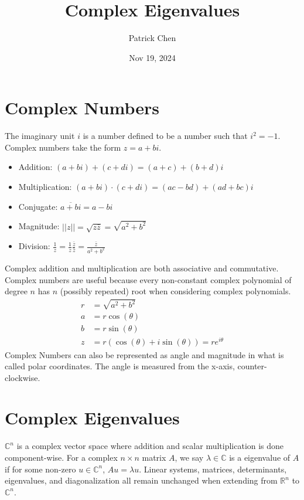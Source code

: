 \documentclass{article}
\title{Complex Eigenvalues}
\author{Patrick Chen}
\date{Nov 19, 2024}
\theoremstyle{mytheoremstyle}
\theoremstyle{mytheoremstyle}
\theoremstyle{myproblemstyle}
\begin{document}
    \maketitle
    \section*{Complex Numbers}
    The imaginary unit $i$ is a number defined to be a number such that
    $i^2=-1$. Complex numbers take the form $z=a+bi$.
    \begin{itemize}
        \item Addition: $(a+bi) + (c+di) = (a+c) + (b+d)i$
        \item Multiplication: $(a+bi) \cdot (c+di) = (ac-bd) + (ad+bc)i$
        \item Conjugate: $\overline{a+bi} = a-bi$
        \item Magnitude: $||z|| = \sqrt{z\bar{z}} = \sqrt{a^2+b^2}$
        \item Division: $\frac{1}{z} = \frac{1}{z} \frac{\bar{z}}{\bar{z}} = \frac{\bar{z}}{a^2+b^2}$
    \end{itemize}

    Complex addition and multiplication are both associative and commutative.
    Complex numbers are useful because every non-constant complex polynomial of
    degree $n$ has $n$ (possibly repeated) root when considering complex
    polynomials.
    \begin{align*}
        r &= \sqrt{a^2+b^2} \\
        a &= r\cos(\theta) \\
        b &= r\sin(\theta) \\
        z &= r(\cos(\theta) + i\sin(\theta)) = re^{i\theta}
    \end{align*}
    Complex Numbers can also be represented as angle and magnitude in what is
    called polar coordinates. The angle is measured from the x-axis,
    counter-clockwise.

    \section*{Complex Eigenvalues}
    $\mathbb{C}^n$ is a complex vector space where addition and scalar
    multiplication is done component-wise. For a complex $n\times n$ matrix $A$,
    we say $\lambda\in \mathbb{C}$ is a eigenvalue of $A$ if for some non-zero
    $u\in \mathbb{C}^n$, $Au=\lambda u$. Linear systems, matrices, determinants,
    eigenvalues, and diagonalization all remain unchanged when extending from
    $\mathbb{R}^n$ to $\mathbb{C}^n$.
\end{document}
